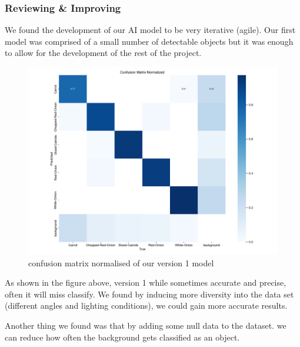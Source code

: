 \documentclass{article}
\begin{document}
\subsubsection{Reviewing \& Improving}
We found the development of our AI model to be very iterative (agile). Our first model was comprised of a small number of detectable objects but it was enough to allow for the development of the rest of the project.
\begin{figure}[h!]
    \centering
    \includegraphics[width=1\linewidth]{assets/confusion_matrix_normalized-Version-1.png}
    \caption{confusion matrix normalised of our version 1 model}
    \label{fig:enter-label}
\end{figure}

As shown in the figure above, version 1 while sometimes accurate and precise, often it will miss classify. We found by inducing more diversity into the data set (different angles and lighting conditions), we could gain more accurate results.

Another thing we found was that by adding some null data to the dataset. we can reduce how often the background gets classified as an object.
\end{document}
